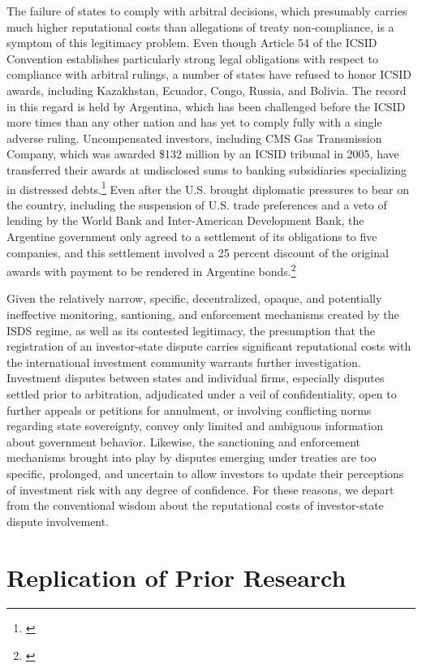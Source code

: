 \documentclass[12pt,onesided]{amsart}
\begin{document}
The failure of states to comply with arbitral decisions, which presumably carries much higher reputational costs than allegations of treaty non-compliance, is a symptom of this legitimacy problem. Even though Article 54 of the ICSID Convention establishes particularly strong legal obligations with respect to compliance with arbitral rulings, a number of states have refused to honor ICSID awards, including Kazakhstan, Ecuador, Congo, Russia, and Bolivia. The record in this regard is held by Argentina, which has been challenged before the ICSID more times than any other nation and has yet to comply fully with a single adverse ruling. Uncompensated investors, including CMS Gas Transmission Company, which was awarded \$132 million by an ICSID tribunal in 2005, have transferred their awards at undisclosed sums to banking subsidiaries specializing in distressed debts.\footnote{\citet{peterson:2009}} Even after the U.S. brought diplomatic pressures to bear on the country, including the suspension of U.S. trade preferences and a veto of lending by the World Bank and Inter-American Development Bank, the Argentine government only agreed to a settlement of its obligations to five companies, and this settlement involved a 25 percent discount of the original awards with payment to be rendered in Argentine bonds.\footnote{\citet{nacion:2013}} 

Given the relatively narrow, specific, decentralized, opaque, and potentially ineffective  monitoring, santioning, and enforcement mechanisms created by the ISDS regime, as well as its contested legitimacy, the presumption that the registration of an investor-state dispute carries significant reputational costs with the international investment community warrants further investigation. Investment disputes between states and individual firms, especially disputes settled prior to arbitration, adjudicated under a veil of confidentiality, open to further appeals or petitions for annulment, or involving conflicting norms regarding state sovereignty, convey only limited and ambiguous information about government behavior. Likewise, the sanctioning and enforcement mechanisms brought into play by disputes emerging under treaties are too specific, prolonged, and uncertain to allow investors to update their perceptions of investment risk with any degree of confidence. For these reasons, we depart from the conventional wisdom about the reputational costs of investor-state dispute involvement.

\section*{Replication of Prior Research}
\end{document}

